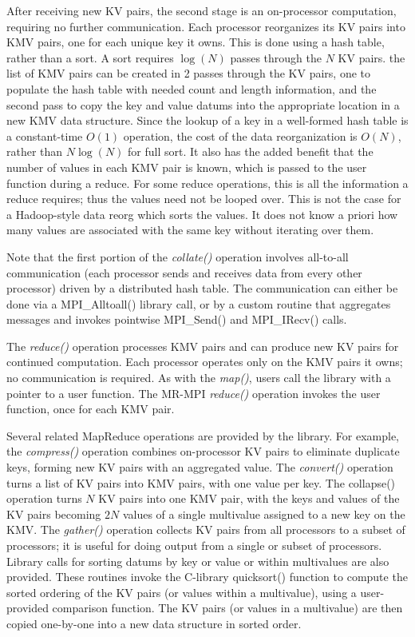 After receiving new KV pairs, the second stage is an on-processor
computation, requiring no further communication.  Each processor
reorganizes its KV pairs into KMV pairs, one for each unique key it
owns.  This is done using a hash table, rather than a sort.  A sort
requires $\log(N)$ passes through the $N$ KV pairs.  the list of KMV
pairs can be created in 2 passes through the KV pairs, one to populate
the hash table with needed count and length information, and the
second pass to copy the key and value datums into the appropriate
location in a new KMV data structure.  Since the lookup of a key in a
well-formed hash table is a constant-time $O(1)$ operation, the cost
of the data reorganization is $O(N)$, rather than $N\log(N)$ for full
sort.  It also has the added benefit that the number of values in each
KMV pair is known, which is passed to the user function during a
reduce.  For some reduce operations, this is all the information a
reduce requires; thus the values need not be looped over.  This is not
the case for a Hadoop-style data reorg which sorts the values.  It
does not know a priori how many values are associated with the same
key without iterating over them.

Note that the first portion of the {\it collate()} operation involves
all-to-all communication (each processor sends and receives data from
every other processor) driven by a distributed hash table.  The
communication can either be done via a MPI\_Alltoall() library call,
or by a custom routine that aggregates messages and invokes pointwise
MPI\_Send() and MPI\_IRecv() calls.

The {\it reduce()} operation processes KMV pairs and can produce new
KV pairs for continued computation.  Each processor operates only on
the KMV pairs it owns; no communication is required.  As with the {\it
map()}, users call the library with a pointer to a user function.  The
MR-MPI {\it reduce()} operation invokes the user function, once for
each KMV pair.

Several related MapReduce operations are provided by the library.  For
example, the {\it compress()} operation combines on-processor KV pairs
to eliminate duplicate keys, forming new KV pairs with an aggregated
value.  The { \it convert()} operation turns a list of KV pairs into
KMV pairs, with one value per key.  The {collapse()} operation turns
$N$ KV pairs into one KMV pair, with the keys and values of the KV
pairs becoming $2N$ values of a single multivalue assigned to a new
key on the KMV.  The {\it gather()} operation collects KV pairs from
all processors to a subset of processors; it is useful for doing
output from a single or subset of processors.  Library calls for
sorting datums by key or value or within multivalues are also
provided.  These routines invoke the C-library quicksort() function to
compute the sorted ordering of the KV pairs (or values within a
multivalue), using a user-provided comparison function.  The KV pairs
(or values in a multivalue) are then copied one-by-one into a new data
structure in sorted order.

